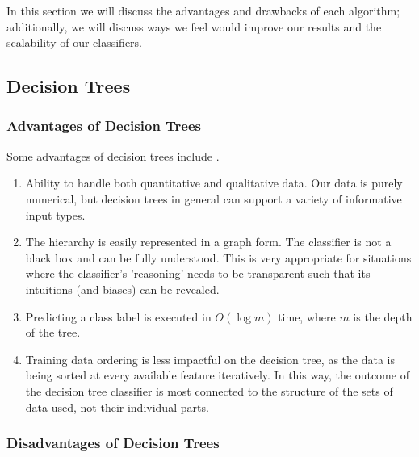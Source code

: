 In this section we will discuss the advantages and drawbacks of each algorithm; additionally, we will discuss ways we feel would improve our results and the scalability of our classifiers.

\subsection{Decision Trees}
\subsubsection{Advantages of Decision Trees}

Some advantages of decision trees include \cite{scikit:decisiontrees}.
%
\begin{enumerate}
\item Ability to handle both quantitative and qualitative data. Our data is purely numerical, but decision trees in general can support a variety of informative input types.
\item The hierarchy is easily represented in a graph form. The classifier is not a black box and can be fully understood. This is very appropriate for situations where the classifier's 'reasoning' needs to be transparent such that its intuitions (and biases) can be revealed.
\item Predicting a class label is executed in $O(\log m)$ time, where $m$ is the depth of the tree.
\item Training data ordering is less impactful on the decision tree, as the data is being sorted at every available feature iteratively. In this way, the outcome of the decision tree classifier is most connected to the structure of the sets of data used, not their individual parts.
\end{enumerate}

\subsubsection{Disadvantages of Decision Trees}

